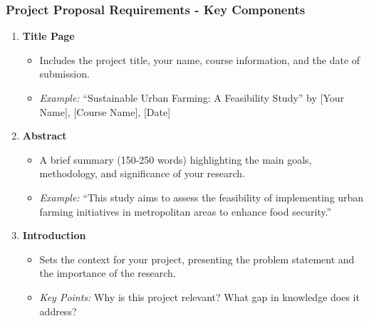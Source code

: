 \documentclass[aspectratio=169]{beamer}
\begin{document}
\begin{frame}[fragile]
    \frametitle{Project Proposal Requirements - Key Components}
    \begin{enumerate}
        \item \textbf{Title Page}
            \begin{itemize}
                \item Includes the project title, your name, course information, and the date of submission.
                \item \textit{Example:} ``Sustainable Urban Farming: A Feasibility Study'' by [Your Name], [Course Name], [Date]
            \end{itemize}
        \item \textbf{Abstract}
            \begin{itemize}
                \item A brief summary (150-250 words) highlighting the main goals, methodology, and significance of your research.
                \item \textit{Example:} ``This study aims to assess the feasibility of implementing urban farming initiatives in metropolitan areas to enhance food security.''
            \end{itemize}
        \item \textbf{Introduction}
            \begin{itemize}
                \item Sets the context for your project, presenting the problem statement and the importance of the research.
                \item \textit{Key Points:} Why is this project relevant? What gap in knowledge does it address?
            \end{itemize}
    \end{enumerate}
\end{frame}
\end{document}
